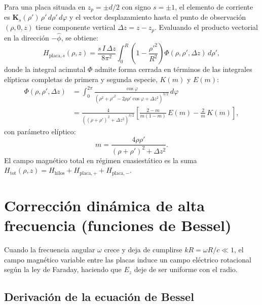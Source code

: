 \documentclass[11pt]{article}
\begin{document}
Para una placa situada en $z_p = \pm d/2$ con signo $s = \pm 1$, el elemento de corriente es $\mathbf{K}_s(\rho')\,\rho'\,d\rho'\,d\varphi$ y el vector desplazamiento hasta el punto de observación $(\rho, 0, z)$ tiene componente vertical $\Delta z = z - z_p$. Evaluando el producto vectorial en la dirección $-\hat{\phi}$, se obtiene:
\begin{equation}
    H_{\mathrm{placa}, s}(\rho, z) = \frac{s\,I\,\Delta z}{8\pi^2} \int_{0}^{R} \left( 1 - \frac{\rho'^2}{R^2} \right) \Phi(\rho, \rho', \Delta z)\,d\rho',
    \label{eq:H-placa}
\end{equation}
donde la integral acimutal $\Phi$ admite forma cerrada en términos de las integrales elípticas completas de primera y segunda especie, $K(m)$ y $E(m)$:
\begin{align}
    \Phi(\rho, \rho', \Delta z) &= \int_{0}^{2\pi} \frac{\cos\varphi}{\left( \rho^2 + \rho'^2 - 2\rho\rho'\cos\varphi + \Delta z^2 \right)^{3/2}}\,d\varphi \nonumber \\
    &= \frac{4}{\left( (\rho + \rho')^2 + \Delta z^2 \right)^{3/2}} \left[ \frac{2 - m}{m(1 - m)}\,E(m) - \frac{2}{m}\,K(m) \right],
\end{align}
con parámetro elíptico:
\begin{equation}
    m = \frac{4\rho\rho'}{(\rho + \rho')^2 + \Delta z^2}.
\end{equation}
El campo magnético total en régimen cuasiestático es la suma $H_{\mathrm{tot}}(\rho, z) = H_{\mathrm{hilos}} + H_{\mathrm{placa},+} + H_{\mathrm{placa},-}$.

\section{Corrección dinámica de alta frecuencia (funciones de Bessel)}

Cuando la frecuencia angular $\omega$ crece y deja de cumplirse $kR = \omega R / c \ll 1$, el campo magnético variable entre las placas induce un campo eléctrico rotacional según la ley de Faraday, haciendo que $E_z$ deje de ser uniforme con el radio.

\subsection{Derivación de la ecuación de Bessel}
\end{document}
